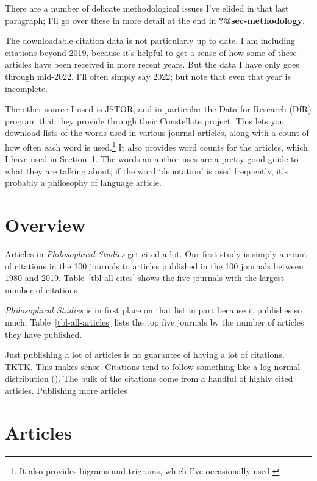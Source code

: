 \documentclass[
  10pt,
  letterpaper,
  DIV=11,
  numbers=noendperiod,
  twoside]{scrartcl}
\begin{document}
There are a number of delicate methodological issues I've elided in that
last paragraph; I'll go over these in more detail at the end in
\textbf{?@sec-methodology}.

The downloadable citation data is not particularly up to date. I am
including citations beyond 2019, because it's helpful to get a sense of
how some of these articles have been received in more recent years. But
the data I have only goes through mid-2022. I'll often simply say 2022;
but note that even that year is incomplete.

The other source I used is JSTOR, and in particular the Data for
Research (DfR) program that they provide through their Constellate
project. This lets you download lists of the words used in various
journal articles, along with a count of how often each word is
used.\footnote{It also provides bigrams and trigrams, which I've
  occasionally used.} It also provides word counts for the articles,
which I have used in Section~\ref{sec-overview}. The words an author
uses are a pretty good guide to what they are talking about; if the word
`denotation' is used frequently, it's probably a philosophy of language
article.

\section{Overview}\label{sec-overview}

Articles in \emph{Philosophical Studies} get cited a lot. Our first
study is simply a count of citations in the 100 journals to articles
published in the 100 journals between 1980 and 2019.
Table~\ref{tbl-all-cites} shows the five journals with the largest
number of citations.

\emph{Philosophical Studies} is in first place on that list in part
because it publishes so much. Table~\ref{tbl-all-articles} lists the top
five journals by the number of articles they have published.

Just publishing a lot of articles is no guarantee of having a lot of
citations. TKTK. This makes sense. Citations tend to follow something
like a log-normal distribution
(). The bulk of
the citations come from a handful of highly cited articles. Publishing
more articles

\section{Articles}\label{articles}
\end{document}
